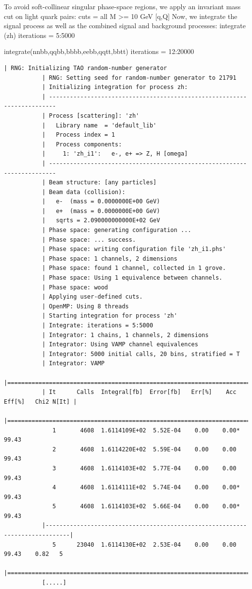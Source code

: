 \documentclass[12pt]{book}
\newenvironment{code}%
  {\begingroup\footnotesize
   \quote
   \Verbatim}%
  {\endVerbatim
   \endquote
   \endgroup\noindent}
\begin{document}
To avoid soft-collinear singular phase-space regions, we apply an
invariant mass cut on light quark pairs:
\begin{code}
cuts = all M >= 10 GeV [q,Q]
\end{code}
Now, we integrate the signal process as well as the combined signal
and background processes:
\begin{code}
integrate (zh) { iterations = 5:5000}

integrate(nnbb,qqbb,bbbb,eebb,qqtt,bbtt) { iterations = 12:20000 }
\end{code}
\begin{scriptsize}
\begin{Verbatim}[frame=single]
           | RNG: Initializing TAO random-number generator
           | RNG: Setting seed for random-number generator to 21791
           | Initializing integration for process zh:
           | ------------------------------------------------------------------------
           | Process [scattering]: 'zh'
           |   Library name  = 'default_lib'
           |   Process index = 1
           |   Process components:
           |     1: 'zh_i1':   e-, e+ => Z, H [omega]
           | ------------------------------------------------------------------------
           | Beam structure: [any particles]
           | Beam data (collision):
           |   e-  (mass = 0.0000000E+00 GeV)
           |   e+  (mass = 0.0000000E+00 GeV)
           |   sqrts = 2.090000000000E+02 GeV
           | Phase space: generating configuration ...
           | Phase space: ... success.
           | Phase space: writing configuration file 'zh_i1.phs'
           | Phase space: 1 channels, 2 dimensions
           | Phase space: found 1 channel, collected in 1 grove.
           | Phase space: Using 1 equivalence between channels.
           | Phase space: wood
           | Applying user-defined cuts.
           | OpenMP: Using 8 threads
           | Starting integration for process 'zh'
           | Integrate: iterations = 5:5000
           | Integrator: 1 chains, 1 channels, 2 dimensions
           | Integrator: Using VAMP channel equivalences
           | Integrator: 5000 initial calls, 20 bins, stratified = T
           | Integrator: VAMP
           |=============================================================================|
           | It      Calls  Integral[fb]  Error[fb]   Err[%]    Acc  Eff[%]   Chi2 N[It] |
           |=============================================================================|
              1       4608  1.6114109E+02  5.52E-04    0.00    0.00*  99.43
              2       4608  1.6114220E+02  5.59E-04    0.00    0.00   99.43
              3       4608  1.6114103E+02  5.77E-04    0.00    0.00   99.43
              4       4608  1.6114111E+02  5.74E-04    0.00    0.00*  99.43
              5       4608  1.6114103E+02  5.66E-04    0.00    0.00*  99.43
           |-----------------------------------------------------------------------------|
              5      23040  1.6114130E+02  2.53E-04    0.00    0.00   99.43    0.82   5
           |=============================================================================|
           [.....]
\end{Verbatim}
\end{scriptsize}
\end{document}
